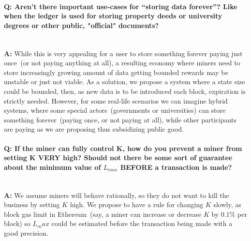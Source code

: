 \documentclass[]{llncs}   %
\begin{document}
\paragraph{\textbf{Q: } Aren't there important use-cases for ``storing data forever''? Like when the ledger is used for storing property deeds or university degrees or other public, "official" documents?}~\\
\textbf{A: } While this is very appealing for a user to store something forever paying just once~(or not paying anything at all), a resulting economy where miners need to store increasingly growing amount of data getting bounded rewards may be unstable or just not viable. As a solution, we propose a system where a state size could be bounded, then, as new data is to be introduced each block, expiration is strictly needed. However, for some real-life scenarios we can imagine hybrid systems, where some special actors~(governments or universities) can store something forever~(paying once, or not paying at all), while other participants are paying as we are proposing thus subsidizing public good.

\paragraph{\textbf{Q: } If the miner can fully control K, how do you prevent a miner from setting K VERY high? Should not there be some sort of guarantee about the minimum value of $L_{max}$ BEFORE a transaction is made?}~\\
\textbf{A: } We assume miners will behave rationally, so they do not want to kill the business by setting $K$ high. We propose to have a rule for changing $K$ slowly, as block gas limit in Ethereum~(say, a miner can increase or decrease $K$ by 0.1\% per block) so $L_max$ could be estimated before the transaction being made with a good precision.
\end{document}
